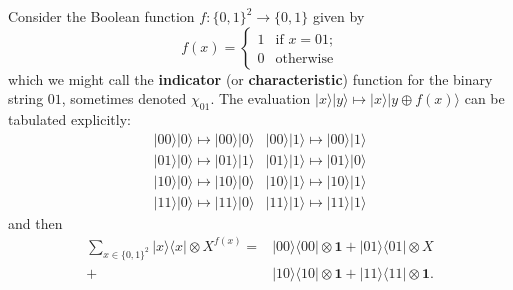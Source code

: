 \documentclass[fleqn]{article}
\begin{document}
Consider the Boolean function \(f\colon\{0,1\}^2\to\{0,1\}\) given by
\[
  f(x)
  = \begin{cases}
    1 &\text{if $x=01$;}
  \\0 &\text{otherwise}
  \end{cases}
\]
which we might call the \textbf{indicator} (or \textbf{characteristic}) function for the binary string \(01\), sometimes denoted \(\chi_{01}\).
The evaluation \(|x\rangle|y\rangle \mapsto |x\rangle|y\oplus f(x)\rangle\) can be tabulated explicitly:
\[
  \begin{array}{cc}
    |00\rangle|0\rangle \longmapsto |00\rangle|0\rangle
    & |00\rangle|1\rangle \longmapsto |00\rangle|1\rangle
  \\|01\rangle|0\rangle \longmapsto |01\rangle|1\rangle
    & |01\rangle|1\rangle \longmapsto |01\rangle|0\rangle
  \\|10\rangle|0\rangle \longmapsto |10\rangle|0\rangle
    & |10\rangle|1\rangle \longmapsto |10\rangle|1\rangle
  \\|11\rangle|0\rangle \longmapsto |11\rangle|0\rangle
    & |11\rangle|1\rangle \longmapsto |11\rangle|1\rangle
  \end{array}
\]
and then
\[
  \begin{aligned}
    \sum_{x\in\{0,1\}^2} |x\rangle\langle x|\otimes X^{f(x)}
    = &|00\rangle\langle 00| \otimes \mathbf{1}
    + |01\rangle\langle 01| \otimes X
  \\+ &|10\rangle\langle 10| \otimes \mathbf{1}
    + |11\rangle\langle 11| \otimes \mathbf{1}.
  \end{aligned}
\]
\end{document}
